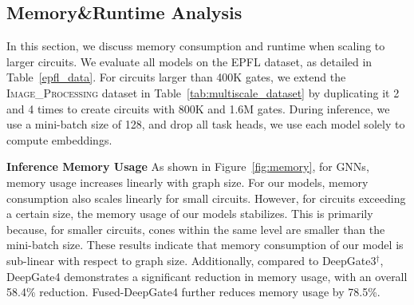 \subsection{Memory\&Runtime Analysis}
\vspace{-5pt}


In this section, we discuss memory consumption and runtime when scaling to larger circuits. We evaluate all models on the EPFL dataset, as detailed in Table~\ref{epfl_data}. For circuits larger than 400K gates, we extend the \textsc{Image\_Processing} dataset in Table~\ref{tab:multiscale_dataset} by duplicating it 2 and 4 times to create circuits with 800K and 1.6M gates. During inference, we use a mini-batch size of 128, and drop all task heads, \ie we use each model solely to compute embeddings.



\noindent\textbf{Inference Memory Usage} As shown in Figure~\ref{fig:memory}, for GNNs, memory usage increases linearly with graph size. For our models, memory consumption also scales linearly for small circuits. However, for circuits exceeding a certain size, the memory usage of our models stabilizes. This is primarily because, for smaller circuits, cones within the same level are smaller than the mini-batch size. These results indicate that memory consumption of our model is sub-linear with respect to graph size. Additionally, compared to DeepGate3$^\dag$, DeepGate4 demonstrates a significant reduction in memory usage, with an overall 58.4\% reduction. Fused-DeepGate4 further reduces memory usage by 78.5\%.

